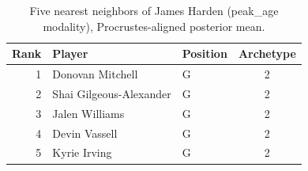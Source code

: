 \begin{table}[htbp]
  \centering\small
  \begin{tabular}{rllc}
    \toprule
    Rank & Player & Position & Archetype \\
    \midrule
    1 & Donovan Mitchell & G & 2 \\
    2 & Shai Gilgeous-Alexander & G & 2 \\
    3 & Jalen Williams & G & 2 \\
    4 & Devin Vassell & G & 2 \\
    5 & Kyrie Irving & G & 2 \\
    \bottomrule
  \end{tabular}
  \caption{Five nearest neighbors of James Harden (peak_age modality), Procrustes-aligned posterior mean.}
  \label{tab:James_Harden_neighbors_peak_age}
\end{table}

